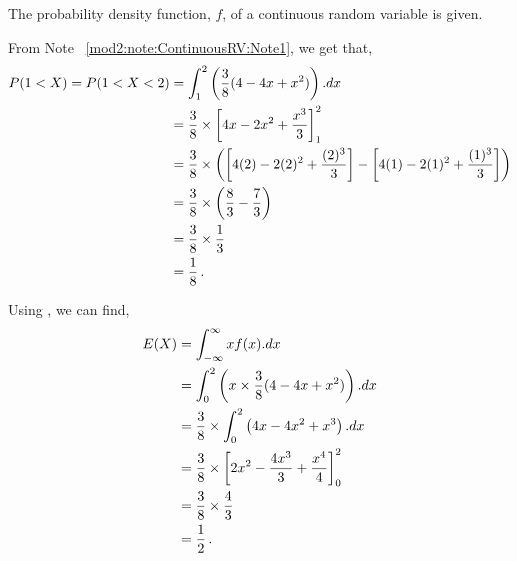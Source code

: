 \begin{subquestions}
\begin{subsubquestions}
\end{subsubquestions}


\subquestion

The probability density function, $f$, of a continuous random variable is given.

\begin{subsubquestions}
	
\subsubquestion

From Note ~\ref{mod2:note:ContinuousRV:Note1}, we get that,
\begin{align}
	P(1<X) = P(1<X<2) & = \int_1^2 \left(\frac{3}{8}(4-4x+x^2) \right).dx \nonumber \\
	                  & = \frac{3}{8} \times \left[4x-2x^2+\frac{x^3}{3} \right]_1^2 \nonumber \\
	                  & = \frac{3}{8} \times \left(\left[4(2)-2(2)^2+\frac{(2)^3}{3} \right]-\left[4(1)-2(1)^2+\frac{(1)^3}{3} \right] \right) \nonumber \\
	                  & = \frac{3}{8} \times \left( \frac{8}{3} - \frac{7}{3}\right) \nonumber \\
	                  & = \frac{3}{8} \times \frac{1}{3} \nonumber \\
	                  & = \frac{1}{8} \,.	
\end{align}


Using , we can find,
\begin{align}
	E(X) & = \int_{-\infty}^{\infty}x f(x).dx \nonumber \\
	     & = \int_{0}^{2} \left(x \times \frac{3}{8}(4-4x+x^2)\right).dx \nonumber \\
	     & = \frac{3}{8} \times \int_{0}^{2} \left(4x-4x^2+x^3\right).dx \nonumber \\
	     & = \frac{3}{8} \times \left[ 2x^2 - \frac{4x^3}{3} + \frac{x^4}{4}\right]_0^2 \nonumber \\
	     & = \frac{3}{8} \times \frac{4}{3} \nonumber \\
	     & = \frac{1}{2} \,. \\
\end{align}


\end{subsubquestions}
\end{subquestions}
